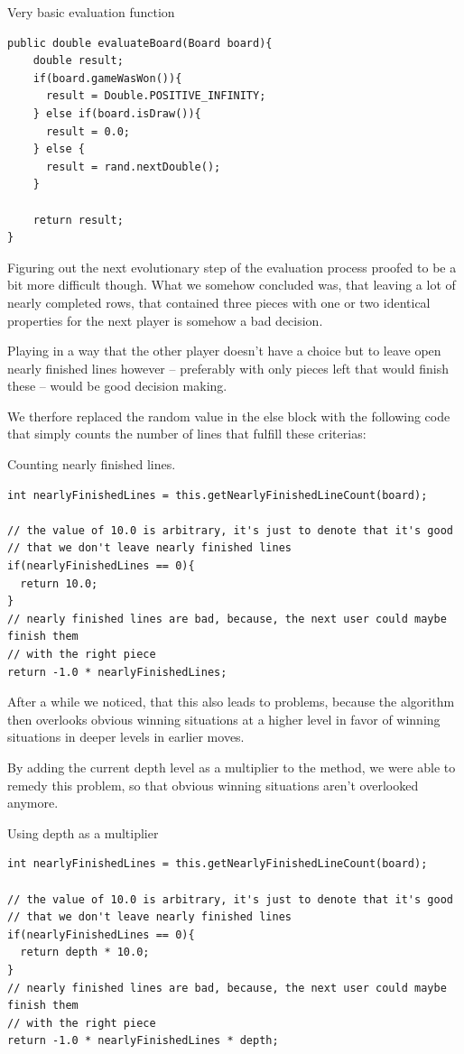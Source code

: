 \documentclass{scrartcl}
\begin{document}
\begin{listing}[H]
\caption{Very basic evaluation function}
\begin{verbatim}
public double evaluateBoard(Board board){
    double result;
    if(board.gameWasWon()){
      result = Double.POSITIVE_INFINITY;
    } else if(board.isDraw()){
      result = 0.0;
    } else {
      result = rand.nextDouble();
    }

    return result;
}
\end{verbatim}
\end{listing}

Figuring out the next evolutionary step of the evaluation process proofed to be a bit more difficult though. What we somehow concluded was, that leaving a lot of nearly completed rows, that contained three pieces with one or two identical properties for the next player is somehow a bad decision.

Playing in a way that the other player doesn't have a choice but to leave open nearly finished lines however -- preferably with only pieces left that would finish these -- would be good decision making.

We therfore replaced the random value in the else block with the following code that simply counts the number of lines that fulfill these criterias:

\begin{listing}[H]
\caption{Counting nearly finished lines.}
\begin{verbatim}
int nearlyFinishedLines = this.getNearlyFinishedLineCount(board);

// the value of 10.0 is arbitrary, it's just to denote that it's good 
// that we don't leave nearly finished lines
if(nearlyFinishedLines == 0){
  return 10.0;
}
// nearly finished lines are bad, because, the next user could maybe finish them 
// with the right piece
return -1.0 * nearlyFinishedLines;
\end{verbatim}
\end{listing}

After a while we noticed, that this also leads to problems, because the algorithm then overlooks obvious winning situations at a higher level in favor of winning situations in deeper levels in earlier moves.

By adding the current depth level as a multiplier to the method, we were able to remedy this problem, so that obvious winning situations aren't overlooked anymore.

\begin{listing}[H]
\caption{Using depth as a multiplier}
\begin{verbatim}
int nearlyFinishedLines = this.getNearlyFinishedLineCount(board);

// the value of 10.0 is arbitrary, it's just to denote that it's good 
// that we don't leave nearly finished lines
if(nearlyFinishedLines == 0){
  return depth * 10.0;
}
// nearly finished lines are bad, because, the next user could maybe finish them 
// with the right piece
return -1.0 * nearlyFinishedLines * depth;
\end{verbatim}
\end{listing}
\end{document}
